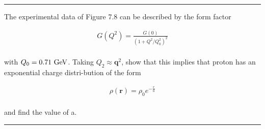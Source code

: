 \noindent\rule{7in}{1.5pt}


\begin{problem}{7.8}
    The experimental data of Figure 7.8 can be described by the form factor

    \begin{align*}
        G(Q^2)= \frac{G(0)}{\left( 1+Q^2/Q_0^2 \right)^2}
    \end{align*}\\
    with $Q_0 = 0.71 \text{ GeV}$. Taking $Q_2 \approx \mathbf{q}^2$, show that this implies that proton has an exponential charge distri-bution of the form

    \begin{align*}
        \rho(\mathbf{r}) = \rho_0 e^{-\frac{r}{a}}
    \end{align*}\\
    and find the value of a.
\end{problem}
\begin{solution}

\end{solution}

\noindent\rule{7in}{1.5pt}

